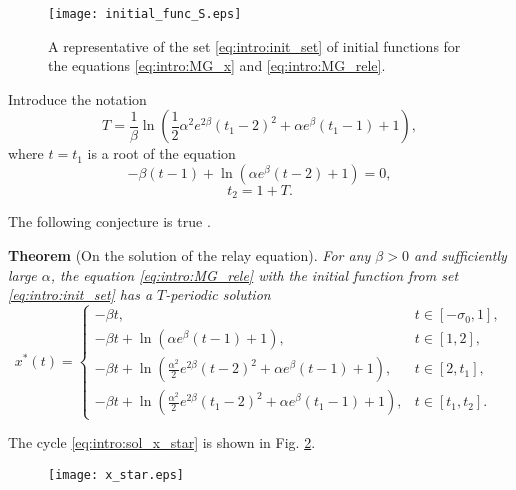\begin{figure}
	\centering
	\texttt{[image: initial\_func\_S.eps]}
	\caption{A representative of the set \eqref{eq:intro:init_set} of initial functions for the equations \eqref{eq:intro:MG_x} and \eqref{eq:intro:MG_rele}.}
	\label{fig:intro:initial_funcs:ch1}
\end{figure}

Introduce the notation
\begin{equation}
	\label{eq:intro:T}
	T = \frac{1}{\beta} \ln\left(\frac{1}{2}\alpha^2e^{2\beta}(t_1 - 2)^2 + \alpha e^{\beta}(t_1 - 1) + 1\right),
\end{equation}
where $t = t_1$ is a root of the equation
\begin{equation}
	\label{eq:intro:t1_cond_exp}
	-\beta(t - 1) + \ln(\alpha e^{\beta}(t - 2) + 1) = 0,
\end{equation}
\begin{equation}
	\label{eq:intro:t2_period}
	t_2 = 1 + T.
\end{equation}

The following conjecture is true \cite{wosbib1}.

\textbf{Theorem} (On the solution of the relay equation). \textit{
	For any \(\beta > 0\) and sufficiently large \(\alpha\), the equation \eqref{eq:intro:MG_rele} with the initial function from set \eqref{eq:intro:init_set} has a $T$-periodic solution
	\small
	\begin{equation}
		\label{eq:intro:sol_x_star}
		x^*(t)= 
		\begin{cases}
			-\beta t, & t\in[-\sigma_0, 1],\\
			-\beta t +\ln(\alpha e^{\beta}(t - 1)+1), & t\in[1, 2],\\
			-\beta t + \ln(\frac{\alpha^2}{2}e^{2\beta}(t - 2)^2+\alpha e^{\beta}(t - 1)+1), & t\in[2, t_1],\\
			-\beta t + \ln(\frac{\alpha^2}{2}e^{2\beta}(t_1 - 2)^2+\alpha e^{\beta}(t_1 - 1) + 1), & t\in[t_1, t_2].
		\end{cases}
	\end{equation}
	\normalsize
}

The cycle \eqref{eq:intro:sol_x_star} is shown in Fig. \ref{fig:intro:x_star:ch1}.

\begin{figure}
	\centering
	\texttt{[image: x\_star.eps]}
	\label{fig:intro:x_star:ch1}
\end{figure}

